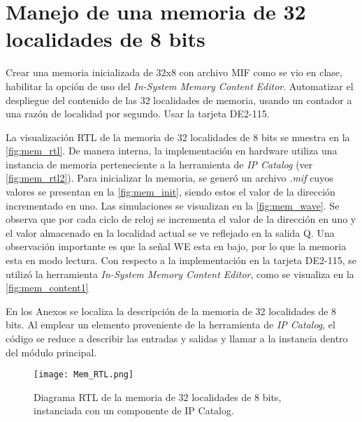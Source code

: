\section{Manejo de una memoria de 32 localidades de 8 bits \label{sec:s1}}

\begin{center}
	\begin{minipage}{12cm}
		\begin{tcolorbox}[title=Actividad 1]
			Crear una memoria inicializada de 32x8 con archivo MIF como se vio en clase, habilitar la opción de uso del \textit{In-System Memory Content Editor}. Automatizar el despliegue del contenido de las 32 localidades de memoria, usando un contador a una razón de localidad por segundo. Usar la tarjeta DE2-115.
		\end{tcolorbox}	
	\end{minipage}
\end{center}

La visualización RTL de la memoria de 32 localidades de 8 bits se muestra en la \autoref{fig:mem_rtl}. De manera interna, la implementación en hardware utiliza una instancia de memoria perteneciente a la herramienta de \textit{IP Catalog} (ver \autoref{fig:mem_rtl2}). Para inicializar la memoria, se generó un archivo \textit{.mif} cuyos valores se presentan en la \autoref{fig:mem_init}, siendo estos el valor de la dirección incrementado en uno. Las simulaciones se visualizan en la \autoref{fig:mem_wave}. Se observa que por cada ciclo de reloj se incrementa el valor de la dirección en uno y el valor almacenado en la localidad actual se ve reflejado en la salida Q. Una observación importante es que la señal WE esta en bajo, por lo que la memoria esta en modo lectura. Con respecto a la implementación en la tarjeta DE2-115, se utilizó la herramienta \textit{In-System Memory Content Editor}, como se visualiza en la \autoref{fig:mem_content1}

En los Anexos se localiza la descripción de la memoria de 32 localidades de 8 bits. Al emplear un elemento proveniente de la herramienta de \textit{IP Catalog}, el código se reduce a describir las entradas y salidas y llamar a la instancia dentro del módulo principal.

\begin{figure}[ht]
	\centering
	\texttt{[image: Mem\_RTL.png]}
	\caption{Diagrama RTL de la memoria de 32 localidades de 8 bits, instanciada con un componente de IP Catalog. \label{fig:mem_rtl}}
\end{figure}

